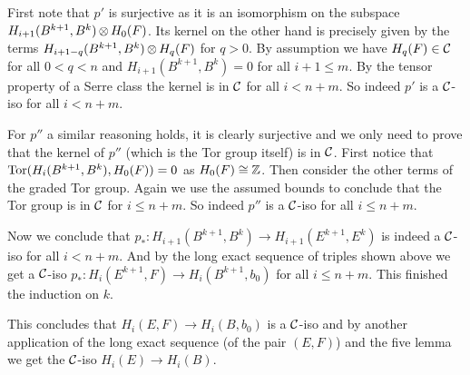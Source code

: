 {	First note that $p'$ is surjective as it is an isomorphism on the subspace $H_{i+1}(B^{k+1}, B^k) \operatorname*{\otimes} H_0(F)$. Its kernel on the other hand is precisely given by the terms $H_{i+1-q}(B^{k+1}, B^k) \operatorname*{\otimes} H_q(F)$ for $q>0$. By assumption we have $H_q(F) \in \mathcal{C}$ for all $0 < q < n$ and $H_{i+1}(B^{k+1}, B^k) = 0$ for all $i+1 \leq m$. By the tensor property of a Serre class the kernel is in $\mathcal{C}$ for all $i < n+m$. So indeed $p'$ is a $\mathcal{C}$-iso for all $i < n+m$.

	For $p''$ a similar reasoning holds, it is clearly surjective and we only need to prove that the kernel of $p''$ (which is the Tor group itself) is in $\mathcal{C}$. First notice that $\operatorname*{Tor}(H_i(B^{k+1}, B^k), H_0(F)) = 0$ as $H_0(F) \cong \mathbb{Z}$. Then consider the other terms of the graded Tor group. Again we use the assumed bounds to conclude that the Tor group is in $\mathcal{C}$ for $i \leq n+m$. So indeed $p''$ is a $\mathcal{C}$-iso for all $i \leq n+m$.

	Now we conclude that $p_\ast : H_{i+1}(B^{k+1}, B^k) \to H_{i+1}(E^{k+1}, E^k)$ is indeed a $\mathcal{C}$-iso for all $i < n+m$. And by the long exact sequence of triples shown above we get a $\mathcal{C}$-iso $p_\ast : H_i(E^{k+1}, F) \to H_i(B^{k+1}, b_0)$ for all $i \leq n+m$. This finished the induction on $k$.

	This concludes that $H_i(E, F) \to H_i(B, b_0)$ is a $\mathcal{C}$-iso and by another application of the long exact sequence (of the pair $(E,F)$) and the five lemma we get the $\mathcal{C}$-iso $H_i(E) \to H_i(B)$.
}


